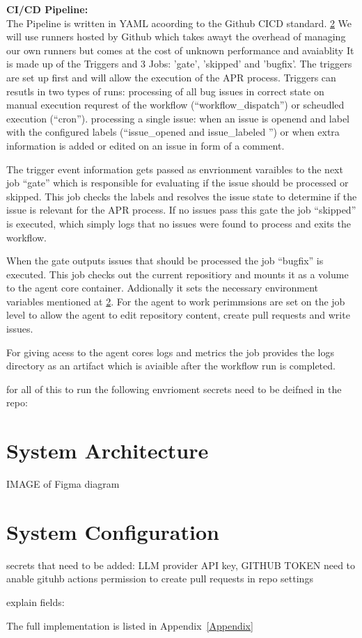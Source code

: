 \textbf{CI/CD Pipeline:}\\
The Pipeline is written in YAML acoording to the Github CICD standard. \ref{}
We will use runners hosted by Github which takes awayt the overhead of managing our own runners but comes at the cost of unknown performance and avaiablity
It is made up of the Triggers and 3 Jobs: 'gate', 'skipped' and 'bugfix'.
The triggers are set up first and will allow the execution of the APR process.
Triggers can resutls in two types of runs:
processing of all bug issues in correct state on manual execution requrest of the workflow (``workflow\_dispatch'') or scheudled execution (``cron'').
processing a single issue: when an issue is openend and label with the configured labels (``issue\_opened and issue\_labeled '') or when extra information is added or edited on an issue in form of a comment.

The trigger  event information gets passed as envrionment varaibles to the next job
``gate'' which is responsible for evaluating if the issue should be processed or skipped. This job checks the labels and resolves the issue state to determine if the issue is relevant for the APR process.
If no issues pass this gate the job ``skipped'' is executed, which simply logs that no issues were found to process and exits the workflow.

When the gate outputs issues that should be processed the job ``bugfix'' is executed. This job checks out the current repositiory and mounts it as a volume to the agent core container. Addionally it sets the necessary environment variables mentioned at \ref{}. For the agent to work perimmsions are set on the job level to allow the agent to edit repository content, create pull requests and write issues.

For giving acess to the agent cores logs and metrics the job provides the logs directory as an artifact which is aviaible after the workflow run is completed.


for all of this to run the following envrioment secrets need to be deifned in the repo:


\section{System Architecture}

IMAGE of Figma diagram



\section{System Configuration}




secrets that need to be added:
LLM provider API key, GITHUB TOKEN
need to anable gituhb actions permission to create pull requests in repo settings

explain fields:

The full implementation is listed in Appendix~\ref{Appendix}